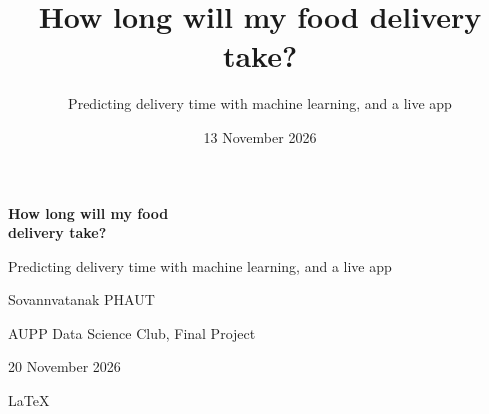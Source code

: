 \documentclass[aspectratio=169,12pt]{beamer}
\title{How long will my food delivery take?}
\subtitle{Predicting delivery time with machine learning, and a live app}
\author{\presenter}
\institute{AUPP Data Science Club \textbullet\ Final Project}
\date{13 November 2026}
\newcommand{\presenter}{Sovannvatanak PHAUT}
\begin{document}
\begin{frame}[plain,label=title]
  \vspace{0.5cm}
  \hspace{0.6cm}\begin{minipage}{0.85\textwidth}\raggedright
    {\fontsize{30}{34}\selectfont\bfseries\color{ink}How long will my food\\delivery take?\par}
    \vspace{0.3cm}
    {\Large\color{teal}Predicting delivery time with machine learning, and a live app\par}
    \vspace{0.3cm}
    \begin{center}
    {\large\presenter\par}
    {\color{grey}AUPP Data Science Club, Final Project\par}
    {\color{grey}20 November 2026\par}
    {\color{grey}\LaTeX\par}
    \end{center}
    \vspace{0.1cm}
    \hyperlink{s-problem}{}
  \end{minipage}
\end{frame}
 
\end{document}
